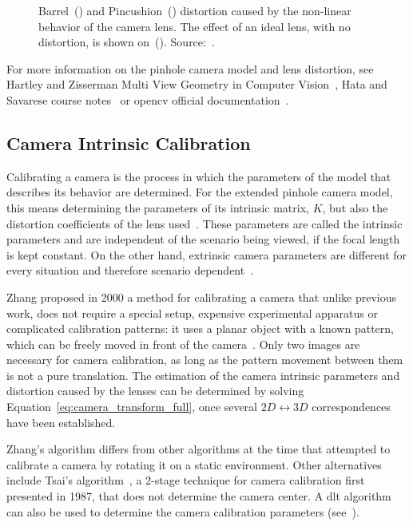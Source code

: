 \begin{figure}[!ht]
	\caption[Effects of barrel and pincushion distortion caused by a non-linear lens.]{Barrel~() and Pincushion~() distortion caused by the non-linear behavior of the camera lens. The effect of an ideal lens, with no distortion, is shown on~(). Source:~\cite{camera_models}.}
	\label{fig:lense_distortion_types}
\end{figure}

For more information on the pinhole camera model and lens distortion, see Hartley and Zisserman Multi View Geometry in Computer Vision~\cite{mvg_book}, Hata and Savarese course notes~\cite{camera_models} or \acf{opencv} official documentation~\cite{opencv_doc}. 

\subsection{Camera Intrinsic Calibration}
\label{subsec:sota:camera-intrinisc-calibration}
Calibrating a camera is the process in which the parameters of the model that describes its behavior are determined. For the extended pinhole camera model, this means determining the parameters of its intrinsic matrix, $K$, but also the distortion coefficients of the lens used~\cite{mvg_book, camera_models, Bouguet2010, Heikkila1997}. These parameters are called the intrinsic parameters and are independent of the scenario being viewed, if the focal length is kept constant. On the other hand, extrinsic camera parameters are different for every situation and therefore scenario dependent~\cite{opencv_doc, Bouguet2010, Heikkila1997}.

Zhang proposed in 2000 a method for calibrating a camera that unlike previous work, does not require a special setup, expensive experimental apparatus or complicated calibration patterns: it uses a planar object with a known pattern, which can be freely moved in front of the camera~\cite{Zhang2000}. Only two images are necessary for camera calibration, as long as the pattern movement between them is not a pure translation. The estimation of the camera intrinsic parameters and distortion caused by the lenses can be determined by solving Equation~\eqref{eq:camera_transform_full}, once several $2D \leftrightarrow 3D$ correspondences have been established.

Zhang's algorithm differs from other algorithms at the time that attempted to calibrate a camera by rotating it on a static environment. Other alternatives include Tsai's algorithm~\cite{Roger1987, mvg_book}, a 2-stage technique for camera calibration first presented in 1987, that does not determine the camera center. A \ac{dlt} algorithm can also be used to determine the camera calibration parameters (see~\cite{mvg_book}).

